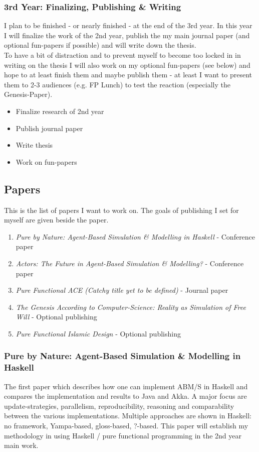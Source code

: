 \subsubsection{3rd Year: Finalizing, Publishing \& Writing}
I plan to be finished - or nearly finished - at the end of the 3rd year. In this year I will finalize the work of the 2nd year, publish the my main journal paper (and optional fun-papers if possible) and will write down the thesis. \\ To have a bit of distraction and to prevent myself to become too locked in in writing on the thesis I will also work on my optional fun-papers (see below) and hope to at least finish them and maybe publish them - at least I want to present them to 2-3 audiences (e.g. FP Lunch) to test the reaction (especially the Genesis-Paper).

\begin{itemize}
\item Finalize research of 2nd year
\item Publish journal paper
\item Write thesis
\item Work on fun-papers
\end{itemize}

\subsection{Papers}
This is the list of papers I want to work on. The goals of publishing I set for myself are given beside the paper.

\begin{enumerate}
\item \textit{Pure by Nature: Agent-Based Simulation \& Modelling in Haskell} - Conference paper
\item \textit{Actors: The Future in Agent-Based Simulation \& Modelling?} - Conference paper
\item \textit{Pure Functional ACE (Catchy title yet to be defined)} - Journal paper
\item \textit{The Genesis According to Computer-Science: Reality as Simulation of Free Will} - Optional publishing
\item \textit{Pure Functional Islamic Design} - Optional publishing
\end{enumerate}

\subsubsection{Pure by Nature: Agent-Based Simulation \& Modelling in Haskell}
The first paper which describes how one can implement ABM/S in Haskell and compares the implementation and results to Java and Akka. A major focus are update-strategies, parallelism, reproducibility, reasoning and comparability between the various implementations. Multiple approaches are shown in Haskell: no framework, Yampa-based, gloss-based, ?-based. This paper will establish my methodology in using Haskell / pure functional programming in the 2nd year main work.

